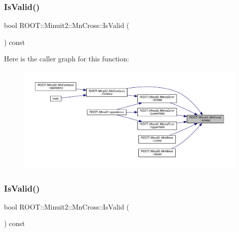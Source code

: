 \mbox{\label{classROOT_1_1Minuit2_1_1MnCross_a9cee17151ec7e078fc6efbfa32120a1a}} 
\subsubsection{\texorpdfstring{IsValid()}{IsValid()}\hspace{0.1cm}{\footnotesize\ttfamily [1/2]}}
{\footnotesize\ttfamily bool R\+O\+O\+T\+::\+Minuit2\+::\+Mn\+Cross\+::\+Is\+Valid (\begin{DoxyParamCaption}{ }\end{DoxyParamCaption}) const\hspace{0.3cm}{\ttfamily [inline]}}

Here is the caller graph for this function\+:\nopagebreak
\begin{figure}[H]
\begin{center}
\leavevmode
\includegraphics[width=350pt]{d3/db2/classROOT_1_1Minuit2_1_1MnCross_a9cee17151ec7e078fc6efbfa32120a1a_icgraph}
\end{center}
\end{figure}
\mbox{\label{classROOT_1_1Minuit2_1_1MnCross_a9cee17151ec7e078fc6efbfa32120a1a}} 
\subsubsection{\texorpdfstring{IsValid()}{IsValid()}\hspace{0.1cm}{\footnotesize\ttfamily [2/2]}}
{\footnotesize\ttfamily bool R\+O\+O\+T\+::\+Minuit2\+::\+Mn\+Cross\+::\+Is\+Valid (\begin{DoxyParamCaption}{ }\end{DoxyParamCaption}) const\hspace{0.3cm}{\ttfamily [inline]}}

